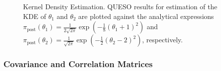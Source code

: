 % 

\begin{figure}[htpb]
\centering 
\vspace*{-10pt}
\caption{Kernel Density Estimation. QUESO results for estimation of the KDE of $\theta_1$ and $\theta_2$ are plotted against the analytical expressions $\pi_{\text{post}}(\theta_1)  =  \frac{1}{2\sqrt{2\pi}} \exp\left(-\frac{1}{8}(\theta_1+1)^2 \right)$  and $\pi_{\text{post}}(\theta_2)  =  \frac{1}{ \sqrt{2\pi}} \exp\left(-\frac{1}{2}(\theta_2-2)^2 \right)$, respectively.}
\label{fig:simple_sip_kde}
\end{figure}


\subsubsection{Covariance and Correlation Matrices}

